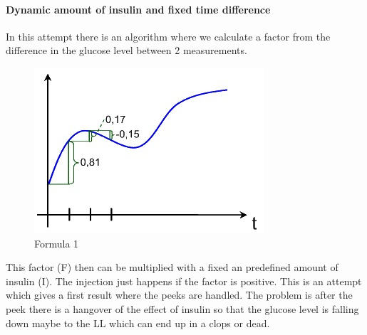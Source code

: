 \documentclass[pdflatex,a4paper,11pt,english]{scrreprt}
\begin{document}
\paragraph{Dynamic amount of insulin and fixed time difference}
In this attempt there is an algorithm where we calculate a factor from the difference in the glucose level between 2 measurements.
\begin{figure}[htb]
\centering
\includegraphics[width=\textwidth]{images/graf1.jpg}
\caption{Formula 1}
\label{fig:formula_1}
\end{figure}
This factor (F) then can be multiplied with a fixed an predefined amount of insulin (I). The injection just happens if the factor is positive. This is an attempt which gives a first result where the peeks are handled. The problem is after the peek there is a hangover of the effect of insulin so that the glucose level is falling down maybe to the LL which can end up in a clops or dead.
\end{document}
